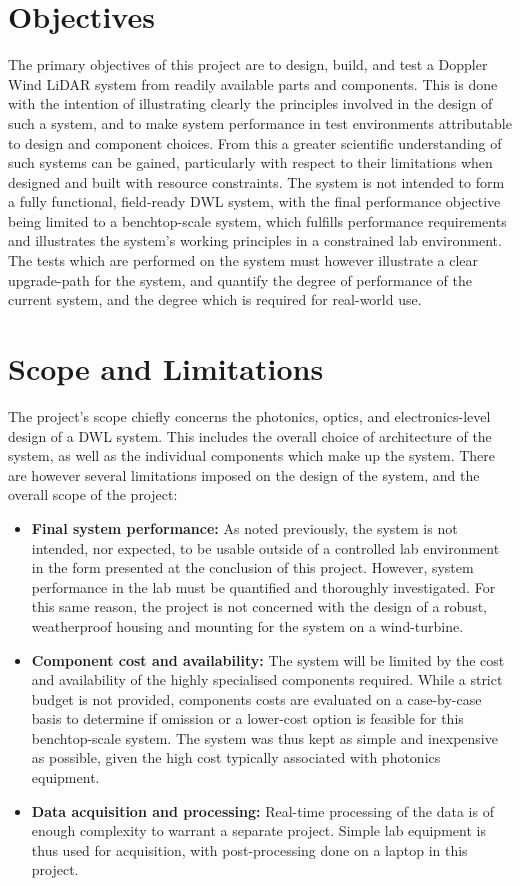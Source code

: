 \section{Objectives}
The primary objectives of this project are to design, build, and test a Doppler Wind LiDAR system from readily available parts and components. This is done with the intention of illustrating clearly the principles involved in the design of such a system, and to make system performance in test environments attributable to design and component choices. From this a greater scientific understanding of such systems can be gained, particularly with respect to their limitations when designed and built with resource constraints. The system is not intended to form a fully functional, field-ready DWL system, with the final performance objective being limited to a benchtop-scale system, which fulfills performance requirements and illustrates the system's working principles in a constrained lab environment. The tests which are performed on the system must however illustrate a clear upgrade-path for the system, and quantify the degree of performance of the current system, and the degree which is required for real-world use. 

\section{Scope and Limitations}
The project's scope chiefly concerns the photonics, optics, and electronics-level design of a DWL system. This includes the overall choice of architecture of the system, as well as the individual components which make up the system. There are however several limitations imposed on the design of the system, and the overall scope of the project:

\begin{itemize}
	\item \textbf{Final system performance:} As noted previously, the system is not intended, nor expected, to be usable outside of a controlled lab environment in the form presented at the conclusion of this project. However, system performance in the lab must be quantified and thoroughly investigated. For this same reason, the project is not concerned with the design of a robust, weatherproof housing and mounting for the system on a wind-turbine. 
	\item \textbf{Component cost and availability:} The system will be limited by the cost and availability of the highly specialised components required. While a strict budget is not provided, components costs are evaluated on a case-by-case basis to determine if omission or a lower-cost option is feasible for this benchtop-scale system. The system was thus kept as simple and inexpensive as possible, given the high cost typically associated with photonics equipment. 
	\item \textbf{Data acquisition and processing:} Real-time processing of the data is of enough complexity to warrant a separate project. Simple lab equipment is thus used for acquisition, with post-processing done on a laptop in this project.
\end{itemize}

